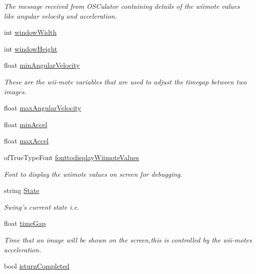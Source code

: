 \begin{DoxyCompactItemize}
\begin{DoxyCompactList}\small\item\em The message received from O\-S\-Culator containing details of the wiimote values like angular velocity and acceleration. \end{DoxyCompactList}\item 
int \hyperlink{group___wii_mote_ga9ed611377cd46f5148a3a3d538e96484}{window\-Width}
\item 
int \hyperlink{group___wii_mote_ga4e8884eeef5b2657b62278969d4e3dcf}{window\-Height}
\item 
float \hyperlink{classtest_app_ac559756a01e0b98378bc29dfba9fac79}{min\-Angular\-Velocity}
\begin{DoxyCompactList}\small\item\em These are the wii-\/mote variables that are used to adjust the timegap between two images. \end{DoxyCompactList}\item 
float \hyperlink{classtest_app_ab9565e8e6dc748ef68e6845f5f94cae9}{max\-Angular\-Velocity}
\item 
float \hyperlink{classtest_app_ab007edbc20b09d607f8010e2dbafdb97}{min\-Accel}
\item 
float \hyperlink{classtest_app_a34e834a5e4d359700147a74eece8eed1}{max\-Accel}
\item 
of\-True\-Type\-Font \hyperlink{classtest_app_ab336e228840f001d15f9b1eb3a30972f}{fonttodisplay\-Wiimote\-Values}
\begin{DoxyCompactList}\small\item\em Font to display the wiimote values on screen for debugging. \end{DoxyCompactList}\item 
string \hyperlink{classtest_app_a8ce5505df4526abed238956b65956edd}{State}
\begin{DoxyCompactList}\small\item\em Swing's current state i.\-e. \end{DoxyCompactList}\item 
float \hyperlink{classtest_app_a944f2713019239a4b49241a5cc9a00c9}{time\-Gap}
\begin{DoxyCompactList}\small\item\em Time that an image will be shown on the screen,this is controlled by the wii-\/motes acceleration. \end{DoxyCompactList}\item 
bool \hyperlink{classtest_app_a42478a80a90ce9f663c04bcdaea5c5bd}{isturn\-Completed}

\end{DoxyCompactItemize}
